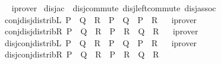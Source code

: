 \begin{isabellebody}
\isadelimproof
\ %
\endisadelimproof
%
\isatagproof
{}\isamarkupfalse%
\ iprover%
\endisatagproof
{\isafoldproof}%
%
\isadelimproof
%
\endisadelimproof
\isanewline
\isanewline
{}\isamarkupfalse%
\ disj{\isacharunderscore}{\kern0pt}ac\ {\isacharequal}{\kern0pt}\ disj{\isacharunderscore}{\kern0pt}commute\ disj{\isacharunderscore}{\kern0pt}left{\isacharunderscore}{\kern0pt}commute\ disj{\isacharunderscore}{\kern0pt}assoc\isanewline
\isanewline
{}\isamarkupfalse%
\ conj{\isacharunderscore}{\kern0pt}disj{\isacharunderscore}{\kern0pt}distribL{\isacharcolon}{\kern0pt}\ {\isachardoublequoteopen}P\ {\isasymand}\ {\isacharparenleft}{\kern0pt}Q\ {\isasymor}\ R{\isacharparenright}{\kern0pt}\ {\isasymlongleftrightarrow}\ P\ {\isasymand}\ Q\ {\isasymor}\ P\ {\isasymand}\ R{\isachardoublequoteclose}%
\isadelimproof
\ %
\endisadelimproof
%
\isatagproof
{}\isamarkupfalse%
\ iprover%
\endisatagproof
{\isafoldproof}%
%
\isadelimproof
%
\endisadelimproof
\isanewline
{}\isamarkupfalse%
\ conj{\isacharunderscore}{\kern0pt}disj{\isacharunderscore}{\kern0pt}distribR{\isacharcolon}{\kern0pt}\ {\isachardoublequoteopen}{\isacharparenleft}{\kern0pt}P\ {\isasymor}\ Q{\isacharparenright}{\kern0pt}\ {\isasymand}\ R\ {\isasymlongleftrightarrow}\ P\ {\isasymand}\ R\ {\isasymor}\ Q\ {\isasymand}\ R{\isachardoublequoteclose}%
\isadelimproof
\ %
\endisadelimproof
%
\isatagproof
{}\isamarkupfalse%
\ iprover%
\endisatagproof
{\isafoldproof}%
%
\isadelimproof
%
\endisadelimproof
\isanewline
\isanewline
{}\isamarkupfalse%
\ disj{\isacharunderscore}{\kern0pt}conj{\isacharunderscore}{\kern0pt}distribL{\isacharcolon}{\kern0pt}\ {\isachardoublequoteopen}P\ {\isasymor}\ {\isacharparenleft}{\kern0pt}Q\ {\isasymand}\ R{\isacharparenright}{\kern0pt}\ {\isasymlongleftrightarrow}\ {\isacharparenleft}{\kern0pt}P\ {\isasymor}\ Q{\isacharparenright}{\kern0pt}\ {\isasymand}\ {\isacharparenleft}{\kern0pt}P\ {\isasymor}\ R{\isacharparenright}{\kern0pt}{\isachardoublequoteclose}%
\isadelimproof
\ %
\endisadelimproof
%
\isatagproof
{}\isamarkupfalse%
\ iprover%
\endisatagproof
{\isafoldproof}%
%
\isadelimproof
%
\endisadelimproof
\isanewline
{}\isamarkupfalse%
\ disj{\isacharunderscore}{\kern0pt}conj{\isacharunderscore}{\kern0pt}distribR{\isacharcolon}{\kern0pt}\ {\isachardoublequoteopen}{\isacharparenleft}{\kern0pt}P\ {\isasymand}\ Q{\isacharparenright}{\kern0pt}\ {\isasymor}\ R\ {\isasymlongleftrightarrow}\ {\isacharparenleft}{\kern0pt}P\ {\isasymor}\ R{\isacharparenright}{\kern0pt}\ {\isasymand}\ {\isacharparenleft}{\kern0pt}Q\ {\isasymor}\ R{\isacharparenright}{\kern0pt}{\isachardoublequoteclose}%

\end{isabellebody}
